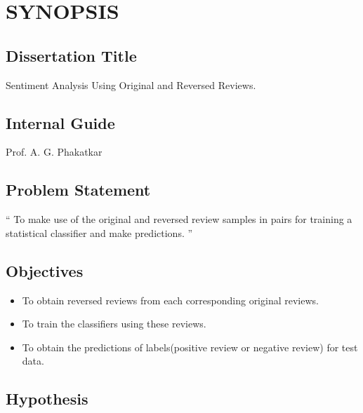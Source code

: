 \documentclass[oneside,a4paper,12pt]{pictreport}
\begin{document}
\setlength{\parindent}{11mm}
\chapter{SYNOPSIS}


\section{Dissertation Title}
Sentiment Analysis Using Original and  Reversed Reviews.



\section{Internal Guide}
Prof. A. G. Phakatkar



\section{Problem Statement}
\label{sec:problem_def}
`` To make use of the original and reversed review samples in pairs for training a
statistical classifier and make predictions. ''

\section{Objectives}
\begin{itemize}
    \item To obtain reversed reviews from each corresponding original reviews.
    \item To train the classifiers  using these reviews.
    \item To obtain the predictions of labels(positive review or negative review) for test data.
\end{itemize}

\section{Hypothesis}
\end{document}
